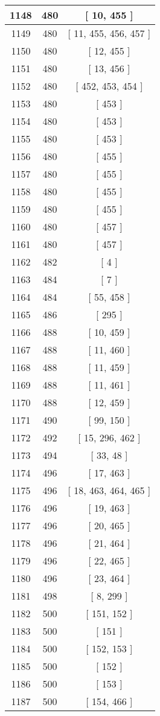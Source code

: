 \begin{center}
\begin{longtable}[H]{|| c c c ||}
\hline
1148 & 480 & [ 10, 455 ] \\ 
\hline
1149 & 480 & [ 11, 455, 456, 457 ] \\ 
\hline
1150 & 480 & [ 12, 455 ] \\ 
\hline
1151 & 480 & [ 13, 456 ] \\ 
\hline
1152 & 480 & [ 452, 453, 454 ] \\ 
\hline
1153 & 480 & [ 453 ] \\ 
\hline
1154 & 480 & [ 453 ] \\ 
\hline
1155 & 480 & [ 453 ] \\ 
\hline
1156 & 480 & [ 455 ] \\ 
\hline
1157 & 480 & [ 455 ] \\ 
\hline
1158 & 480 & [ 455 ] \\ 
\hline
1159 & 480 & [ 455 ] \\ 
\hline
1160 & 480 & [ 457 ] \\ 
\hline
1161 & 480 & [ 457 ] \\ 
\hline
1162 & 482 & [ 4 ] \\ 
\hline
1163 & 484 & [ 7 ] \\ 
\hline
1164 & 484 & [ 55, 458 ] \\ 
\hline
1165 & 486 & [ 295 ] \\ 
\hline
1166 & 488 & [ 10, 459 ] \\ 
\hline
1167 & 488 & [ 11, 460 ] \\ 
\hline
1168 & 488 & [ 11, 459 ] \\ 
\hline
1169 & 488 & [ 11, 461 ] \\ 
\hline
1170 & 488 & [ 12, 459 ] \\ 
\hline
1171 & 490 & [ 99, 150 ] \\ 
\hline
1172 & 492 & [ 15, 296, 462 ] \\ 
\hline
1173 & 494 & [ 33, 48 ] \\ 
\hline
1174 & 496 & [ 17, 463 ] \\ 
\hline
1175 & 496 & [ 18, 463, 464, 465 ] \\ 
\hline
1176 & 496 & [ 19, 463 ] \\ 
\hline
1177 & 496 & [ 20, 465 ] \\ 
\hline
1178 & 496 & [ 21, 464 ] \\ 
\hline
1179 & 496 & [ 22, 465 ] \\ 
\hline
1180 & 496 & [ 23, 464 ] \\ 
\hline
1181 & 498 & [ 8, 299 ] \\ 
\hline
1182 & 500 & [ 151, 152 ] \\ 
\hline
1183 & 500 & [ 151 ] \\ 
\hline
1184 & 500 & [ 152, 153 ] \\ 
\hline
1185 & 500 & [ 152 ] \\ 
\hline
1186 & 500 & [ 153 ] \\ 
\hline
1187 & 500 & [ 154, 466 ] \\ 
\hline
\end{longtable}
\end{center}
